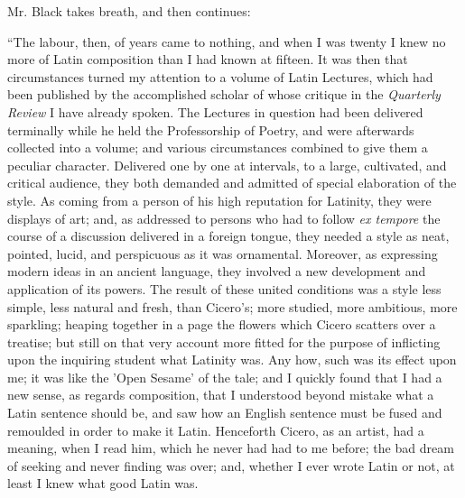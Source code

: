Mr. Black takes breath, and then continues:

``The labour, then, of years came to nothing, and when I was
twenty I knew no more of Latin composition than I had known at
fifteen. It was then that circumstances turned my attention to a
volume of Latin Lectures, which had been published by the accomplished
scholar of whose critique in the \emph{Quarterly Review} I have
already spoken. The Lectures in question had been delivered terminally
while he held the Professorship of Poetry, and were afterwards
collected into a volume; and various circumstances combined to give
them a peculiar character. Delivered one by one at intervals, to a
large, cultivated, and critical audience, they both demanded and
admitted of special elaboration of the style. As coming from a person
of his high reputation for Latinity, they were displays of art; and,
as addressed to persons who had to follow \emph{ex tempore} the course
of a discussion delivered in a foreign tongue, they needed a style as
neat, pointed, lucid, and perspicuous as it was ornamental. Moreover,
as expressing modern ideas in an ancient language, they involved a new
development and application of its powers. The result of these united
conditions was a style less simple, less natural and fresh, than
Cicero's; more studied, more ambitious, more sparkling; heaping
together in a page the flowers which Cicero scatters over a treatise;
but still on that very account more fitted for the purpose of
inflicting upon the inquiring student what Latinity was. Any how, such
was its effect upon me; it was like the 'Open Sesame' of the tale; and
I quickly found that I had a new sense, as regards composition, that I
understood beyond mistake what a Latin sentence should be, and saw how
an English sentence must be fused and remoulded in order to make it
Latin. Henceforth Cicero, as an artist, had a meaning, when I read
him, which he never had had to me before; the bad dream of seeking and
never finding was over; and, whether I ever wrote Latin or not, at
least I knew what good Latin was.

